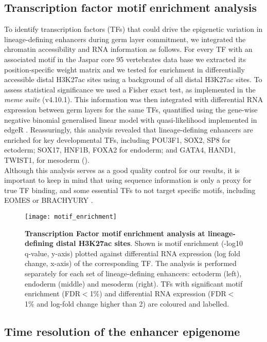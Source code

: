 \subsection{Transcription factor motif enrichment analysis}

To identify transcription factors (TFs) that could drive the epigenetic variation in lineage-defining enhancers during germ layer commitment, we integrated the chromatin accessibility and RNA information as follows. For every TF with an associated motif in the Jaspar core 95 vertebrates data base we extracted its position-specific weight matrix and we tested for enrichment in differentially accessible distal H3K27ac sites using a background of all distal H3K27ac sites. To assess statistical significance we used a Fisher exact test, as implemented in the \textit{meme suite} (v4.10.1). This information was then integrated with differential RNA expression between germ layers for the same TFs, quantified using the gene-wise negative binomial generalised linear model with quasi-likelihood implemented in edgeR \cite{McCarthy2012}. Reassuringly, this analysis revealed that lineage-defining enhancers are enriched for key developmental TFs, including POU3F1, SOX2, SP8 for ectoderm; SOX17, HNF1B, FOXA2 for endoderm; and GATA4, HAND1, TWIST1, for mesoderm ().\\
Although this analysis serves as a good quality control for our results, it is important to keep in mind that using sequence information is only a proxy for true TF binding, and some essential TFs to not target specific motifs, including EOMES or BRACHYURY \cite{Tosic2019}.

\begin{figure}[H]
	\centering
	\texttt{[image: motif\_enrichment]}
	\caption[]{
	\textbf{Transcription Factor motif enrichment analysis at lineage-defining distal H3K27ac sites}. Shown is motif enrichment (-log10 q-value, y-axis) plotted against differential RNA expression (log fold change, x-axis) of the corresponding TF. The analysis is performed separately for each set of lineage-defining enhancers: ectoderm (left), endoderm (middle) and mesoderm (right). TFs with significant motif enrichment (FDR$<$1\%) and differential RNA expression (FDR$<$1\% and log-fold change higher than 2) are coloured and labelled. }
	\label{fig:motif_enrichment}
\end{figure}


\subsection{Time resolution of the enhancer epigenome}

